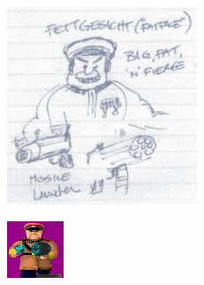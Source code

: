 \documentclass[book.tex]{subfiles}
\begin{document}
      \begin{minipage}{.48\textwidth}
     \includegraphics[width=\textwidth]{imgs/tom_hall_sketch_officer.png}
  \end{minipage}
      \begin{minipage}{.48\textwidth}
     \includegraphics[width=\textwidth]{imgs/sprites/fettgesic.png}
  \end{minipage}
\end{document}
